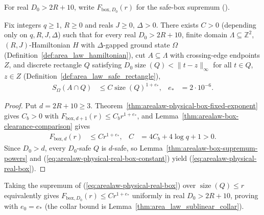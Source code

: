 For real $D_0>2R+10$, write $F_{\mathrm{box},D_0}(r)$ for the safe-box supremum
(\cite[Section~3, before Proposition~3.3; Proposition~9.5]{OpenAI2026AreaLaw}).

\begin{lemma}
    \label{thm:arealaw-physical-safe-rectangle-real}
    \leanok
    Fix integers $q\geq1$, $R\geq0$ and reals $J\geq0$, $\Delta>0$. There exists $C>0$
    (depending only on $q,R,J,\Delta$) such that for every real $D_0>2R+10$, finite domain
    $\Lambda\subseteq\mathbb Z^2$, $(R,J)$-Hamiltonian $H$ with $\Delta$-gapped ground state
    $\Omega$ (Definition~\ref{def:area_law_hamiltonian}), cut $A\subseteq\Lambda$ with crossing-edge
    endpoints $Z$, and discrete rectangle $Q$ satisfying $D_0\operatorname{size}(Q)<\|t-z\|_\infty$
    for all $t\in Q$, $z\in Z$ (Definition~\ref{def:area_law_safe_rectangle}),
    \begin{align}
        S_\Omega(A\cap Q)
         & \leq C\operatorname{size}(Q)^{1+e_*},
         & e_*                                   & =2\cdot10^{-6}.
        \label{eq:arealaw-physical-real-box}
    \end{align}
\end{lemma}
\begin{proof}\leanok
    Put $d=2R+10\ge3$. Theorem~\ref{thm:arealaw-physical-box-fixed-exponent} gives $C_b>0$ with
    $F_{\mathrm{box},d+1}(r)\leq C_b r^{1+e_*}$, and Lemma~\ref{thm:arealaw-box-clearance-comparison}
    gives
    \begin{align}
        F_{\mathrm{box},d}(r)
         & \leq C r^{1+e_*},
         & C                 & =4C_b+4\log q+1>0.
        \label{eq:arealaw-physical-real-box-constant}
    \end{align}
    Since $D_0>d$, every $D_0$-safe $Q$ is $d$-safe, so Lemma~\ref{thm:arealaw-box-supremum-powers}
    and (\ref{eq:arealaw-physical-real-box-constant}) yield (\ref{eq:arealaw-physical-real-box}).
\end{proof}

Taking the supremum of (\ref{eq:arealaw-physical-real-box}) over $\operatorname{size}(Q)\le r$
equivalently gives $F_{\mathrm{box},D_0}(r)\leq Cr^{1+e_*}$ uniformly in real $D_0>2R+10$, proving
\cite[Proposition~3.3 and Proposition~9.5]{OpenAI2026AreaLaw} with $e_0=e_*$
(the collar bound is Lemma~\ref{thm:area_law_sublinear_collar}).
